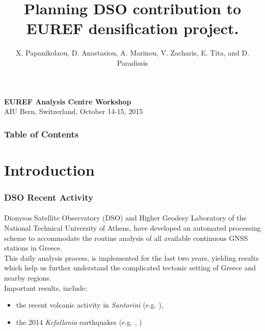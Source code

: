 \documentclass{beamer}
\title{Planning DSO contribution to EUREF densification project.}
\date{}
\author{X. Papanikolaou, D. Anastasiou, A. Marinou, V. Zacharis, E. Tita, and D. Paradissis}
\institute{National Technical University of Athens\\Dionysos Satellite Observatory\\\url{http://dionysos.survey.ntua.gr}}
\begin{document}
\begin{frame}[plain]
\maketitle
\begin{block}{}
    \begin{center}
      \textbf{EUREF Analysis Centre Workshop}\\
    AIU Bern, Switzerland, October 14-15, 2015 \\
    \end{center}
\end{block}
\end{frame}

\begin{frame}
    \frametitle{Table of Contents}
    \tableofcontents
\end{frame}

\section{Introduction}

\begin{frame}\frametitle{DSO Recent Activity}\framesubtitle{}

  Dionysos Satellite Observatory (DSO) and Higher Geodesy Laboratory of the 
  National Technical University of Athens, have developed an automated processing
  scheme to accommodate the routine analysis of all available continuous GNSS 
  stations in Greece.
  \\
  This daily analysis process, is implemented for the last two years, yielding 
  results which help us further understand the complicated tectonic setting of 
  Greece and nearby regions.
  \\
  Important results, include:
  \begin{itemize}
    \item the recent volcanic activity in \emph{Santorini} (e.g. \cite{papoutsis}),
    \item the 2014 \emph{Kefallonia} earthquakes (e.g. \cite{sarkefalonia}, \cite{sakkas})
  \end{itemize}
\end{frame}
\end{document}
